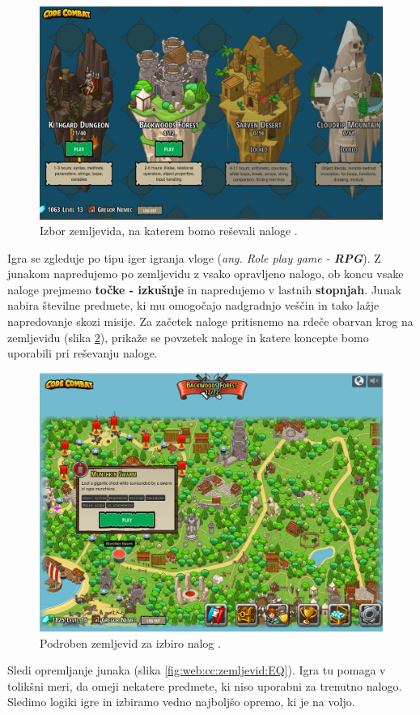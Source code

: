 \begin{figure}[h!]
  \centering
    \includegraphics [width=0.65\linewidth, keepaspectratio =
   1] {./images/sc_web/cc_izbor-zem-v01.jpg}
   \caption{Izbor zemljevida, na katerem bomo reševali naloge
     \cite{web:codecombat}.}
   \label{fig:web:cc:zemljevid}
 \end{figure}

 Igra se zgleduje po tipu iger igranja vloge (\emph{ang. Role play
   game - \textbf{RPG}}). Z junakom napredujemo po zemljevidu z vsako
 opravljeno nalogo, ob koncu vsake naloge prejmemo \textbf{točke -
   izkušnje} in napredujemo v lastnih \textbf{stopnjah}. Junak nabira
 številne predmete, ki mu omogočajo nadgradnjo veščin in tako lažje
 napredovanje skozi misije. Za začetek naloge pritisnemo na rdeče
 obarvan krog na zemljevidu (slika \ref{fig:web:cc:zemljevid:BG}),
 prikaže se povzetek naloge in katere koncepte bomo uporabili pri
 reševanju naloge. 

\begin{figure}[h!]
  \centering
    \includegraphics [width=0.65\linewidth, keepaspectratio =
   1] {./images/sc_web/cc_izbor-zem-BG-v01.jpg}
   \caption{Podroben zemljevid za izbiro nalog \cite{web:codecombat}.}
   \label{fig:web:cc:zemljevid:BG}
 \end{figure}

 Sledi opremljanje junaka (slika \ref{fig:web:cc:zemljevid:EQ}). Igra
 tu pomaga v tolikšni meri, da omeji nekatere predmete, ki niso
 uporabni za trenutno nalogo. Sledimo logiki igre in izbiramo
 vedno najboljšo opremo, ki je na voljo.
 
